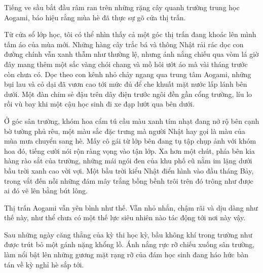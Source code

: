 \documentclass[../main.tex]{subfiles}
\begin{document}


Tiếng ve sầu bắt đầu râm ran trên những rặng cây quanh trường trung học Aogami, báo hiệu rằng mùa hè đã thực sự gõ cửa thị trấn.

Từ cửa sổ lớp học, tôi có thể nhìn thấy cả một góc thị trấn đang khoác lên mình tấm áo của mùa mới. Những hàng cây trắc bá và thông Nhật rải rác dọc con đường chính vẫn xanh thẫm như thường lệ, nhưng ánh nắng chiếu qua vòm lá giờ đây mang thêm một sắc vàng chói chang và mồ hôi ướt áo mà vài tháng trước còn chưa có. Dọc theo con kênh nhỏ chảy ngang qua trung tâm Aogami, những bụi lau và cỏ dại đã vươn cao tới mức đủ để che khuất mặt nước lấp lánh bên dưới. Một đàn chim sẻ đậu trên dây điện trước ngôi đền gần cổng trường, líu lo rồi vù bay khi một cậu học sinh đi xe đạp lướt qua bên dưới.

Ở góc sân trường, khóm hoa cẩm tú cầu màu xanh tím nhạt đang nở rộ bên cạnh bờ tường phủ rêu, một màu sắc đặc trưng mà người Nhật hay gọi là màu của mùa mưa chuyển sang hè. Mấy cô gái từ lớp bên đang tụ tập chụp ảnh với khóm hoa đó, tiếng cười nói rộn ràng vọng vào tận lớp. Xa hơn một chút, phía bên kia hàng rào sắt của trường, những mái ngói đen của khu phố cũ nằm im lặng dưới bầu trời xanh cao vời vợi. Một bầu trời kiểu Nhật điển hình vào đầu tháng Bảy, trong vắt đến nỗi những đám mây trắng bồng bềnh trôi trên đó trông như được ai đó vẽ lên bằng bút lông.

Thị trấn Aogami vẫn yên bình như thế. Vẫn nhỏ nhắn, chậm rãi và dịu dàng như thế này, như thể chưa có một thế lực siêu nhiên nào tác động tới nơi này vậy.

Sau những ngày căng thẳng của kỳ thi học kỳ, bầu không khí trong trường như được trút bỏ một gánh nặng khổng lồ. Ánh nắng rực rỡ chiếu xuống sân trường, làm nổi bật lên những gương mặt rạng rỡ của đám học sinh đang háo hức bàn tán về kỳ nghỉ hè sắp tới.
\end{document}
